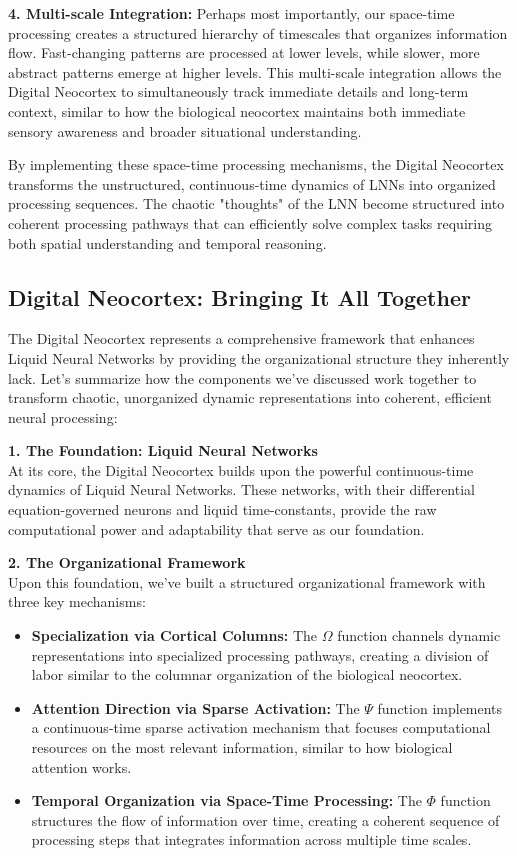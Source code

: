 \documentclass{article}
\begin{document}
\textbf{4. Multi-scale Integration:}
Perhaps most importantly, our space-time processing creates a structured hierarchy of timescales that organizes information flow. Fast-changing patterns are processed at lower levels, while slower, more abstract patterns emerge at higher levels. This multi-scale integration allows the Digital Neocortex to simultaneously track immediate details and long-term context, similar to how the biological neocortex maintains both immediate sensory awareness and broader situational understanding.

By implementing these space-time processing mechanisms, the Digital Neocortex transforms the unstructured, continuous-time dynamics of LNNs into organized processing sequences. The chaotic "thoughts" of the LNN become structured into coherent processing pathways that can efficiently solve complex tasks requiring both spatial understanding and temporal reasoning.

\subsection{Digital Neocortex: Bringing It All Together}
The Digital Neocortex represents a comprehensive framework that enhances Liquid Neural Networks by providing the organizational structure they inherently lack. Let's summarize how the components we've discussed work together to transform chaotic, unorganized dynamic representations into coherent, efficient neural processing:


\textbf{1. The Foundation: Liquid Neural Networks}\\
At its core, the Digital Neocortex builds upon the powerful continuous-time dynamics of Liquid Neural Networks. These networks, with their differential equation-governed neurons and liquid time-constants, provide the raw computational power and adaptability that serve as our foundation.

\textbf{2. The Organizational Framework}\\
Upon this foundation, we've built a structured organizational framework with three key mechanisms:
\begin{itemize}
    \item \textbf{Specialization via Cortical Columns:} The $\Omega$ function channels dynamic representations into specialized processing pathways, creating a division of labor similar to the columnar organization of the biological neocortex.
    \item \textbf{Attention Direction via Sparse Activation:} The $\Psi$ function implements a continuous-time sparse activation mechanism that focuses computational resources on the most relevant information, similar to how biological attention works.
    \item \textbf{Temporal Organization via Space-Time Processing:} The $\Phi$ function structures the flow of information over time, creating a coherent sequence of processing steps that integrates information across multiple time scales.
\end{itemize}
\end{document}
